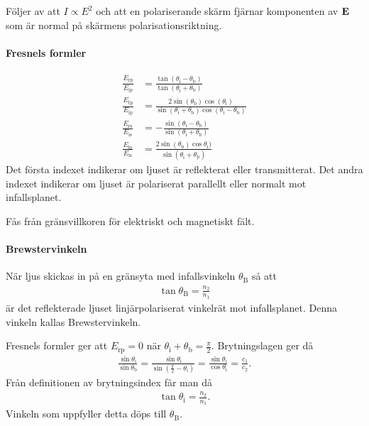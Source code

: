 \deriv
Följer av att $I\propto E^2$ och att en polariserande skärm fjärnar komponenten av $\vb{E}$ som är normal på skärmens polarisationsriktning.

\paragraph{Fresnels formler}
\begin{align*}
	\frac{E_{\text{rp}}}{E_{\text{ip}}} &= \frac{\tan{(\theta_{\text{i}} - \theta_{\text{b}})}}{\tan{(\theta_{\text{i}} + \theta_{\text{b}})}} \\
	\frac{E_{\text{tp}}}{E_{\text{ip}}} &= \frac{2\sin{(\theta_{\text{b}})}\cos{(\theta_{\text{i}})}}{\sin{(\theta_{\text{i}} + \theta_{\text{b}})}\cos{(\theta_{\text{i}} - \theta_{\text{b}})}} \\
	\frac{E_{\text{rs}}}{E_{\text{is}}} &= -\frac{\sin{(\theta_{\text{i}} - \theta_{\text{b}})}}{\sin{(\theta_{\text{i}} + \theta_{\text{b}})}} \\
	\frac{E_{\text{ts}}}{E_{\text{is}}} &= \frac{2\sin{(\theta_{\text{b}})}\cos{\theta_{\text{i}})}}{\sin{(\theta_{\text{i}} + \theta_{\text{p}})}}
\end{align*}
Det första indexet indikerar om ljuset är reflekterat eller transmitterat. Det andra indexet indikerar om ljuset är polariserat parallellt eller normalt mot infallsplanet.

\deriv
Fås från gränsvillkoren för elektriskt och magnetiskt fält.

\paragraph{Brewstervinkeln}
När ljus skickas in på en gränsyta med infallsvinkeln $\theta_{\text{B}}$ så att
\begin{align*}
	\tan{\theta_{\text{B}}} = \frac{n_2}{n_1}
\end{align*}
är det reflekterade ljuset linjärpolariserat vinkelrät mot infallsplanet. Denna vinkeln kallas Brewstervinkeln.

\deriv
Fresnels formler ger att $E_{\text{rp}} = 0$ när $\theta_{\text{i}} + \theta_{\text{b}} = \frac{\pi}{2}$. Brytningslagen ger då
\begin{align*}
	\frac{\sin{\theta_{\text{i}}}}{\sin{\theta_{\text{b}}}} = \frac{\sin{\theta_{\text{i}}}}{\sin{\left(\frac{\pi}{2} - \theta_{\text{i}}\right)}} = \frac{\sin{\theta_{\text{i}}}}{\cos{\theta_{\text{i}}}} = \frac{c_{1}}{c_{2}}.
\end{align*}
Från definitionen av brytningsindex får man då
\begin{align*}
	\tan{\theta_{\text{i}}} = \frac{n_2}{n_1}.
\end{align*}
Vinkeln som uppfyller detta döps till $\theta_{\text{B}}$.

